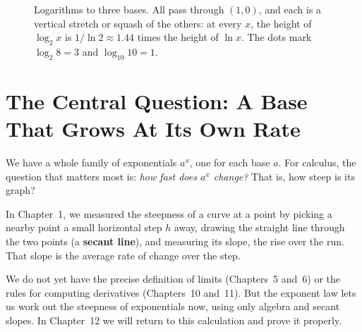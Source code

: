\begin{figure}[htbp]
\centering
{}
\caption{Logarithms to three bases. All pass through $(1,0)$, and each is a vertical stretch or squash of the others: at every $x$, the height of $\log_2 x$ is $1/\ln 2\approx 1.44$ times the height of $\ln x$. The dots mark $\log_2 8=3$ and $\log_{10}10=1$.}
\label{ch03:fig-change-base}
\end{figure}

\section{The Central Question: A Base That Grows At Its Own Rate}

We have a whole family of exponentials $a^x$, one for each base $a$. For calculus, the question that matters most is: \emph{how fast does $a^x$ change?} That is, how steep is its graph?

In Chapter~1, we measured the steepness of a curve at a point by picking a nearby point a small horizontal step $h$ away, drawing the straight line through the two points (a \textbf{secant line}), and measuring its slope, the rise over the run. That slope is the average rate of change over the step.

We do not yet have the precise definition of limits (Chapters~5 and~6) or the rules for computing derivatives (Chapters~10 and~11). But the exponent law lets us work out the steepness of exponentials now, using only algebra and secant slopes. In Chapter~12 we will return to this calculation and prove it properly.

